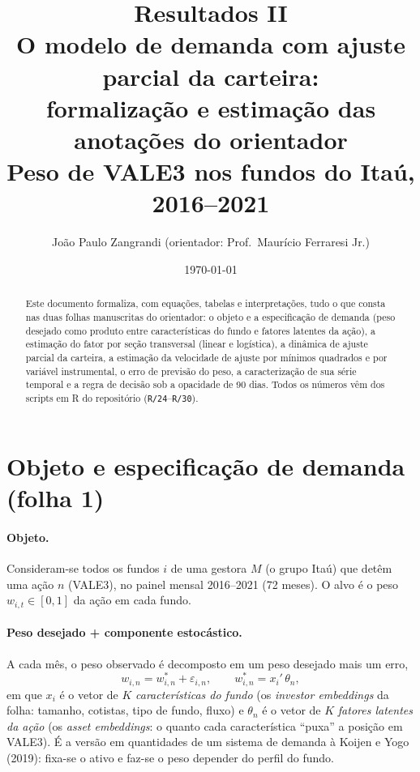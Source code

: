 \documentclass[11pt,a4paper]{article}
\title{\textbf{Resultados II}\\[3pt]
\large O modelo de demanda com ajuste parcial da carteira:\\
formalização e estimação das anotações do orientador\\[4pt]
\normalsize Peso de VALE3 nos fundos do Itaú, 2016--2021}
\author{João Paulo Zangrandi \quad (orientador: Prof.\ Maurício Ferraresi Jr.)}
\date{\today}
\begin{document}
\maketitle

\begin{abstract}
\noindent Este documento formaliza, com equações, tabelas e interpretações, tudo o que consta nas
duas folhas manuscritas do orientador: o objeto e a especificação de demanda (peso desejado como
produto entre características do fundo e fatores latentes da ação), a estimação do fator por seção
transversal (linear e logística), a dinâmica de ajuste parcial da carteira, a estimação da
velocidade de ajuste por mínimos quadrados e por variável instrumental, o erro de previsão do peso,
a caracterização de sua série temporal e a regra de decisão sob a opacidade de 90 dias. Todos os
números vêm dos scripts em R do repositório (\texttt{R/24}--\texttt{R/30}).
\end{abstract}

\tableofcontents
\bigskip

\section{Objeto e especificação de demanda (folha 1)}

\paragraph{Objeto.} Consideram-se todos os fundos $i$ de uma gestora $M$ (o grupo Itaú) que detêm
uma ação $n$ (VALE3), no painel mensal 2016--2021 (72 meses). O alvo é o peso $w_{i,t}\in[0,1]$ da
ação em cada fundo.

\paragraph{Peso desejado + componente estocástico.} A cada mês, o peso observado é decomposto em um
peso desejado mais um erro,
\begin{equation}
w_{i,n} = w^{*}_{i,n} + \varepsilon_{i,n}, \qquad w^{*}_{i,n} = x_i'\,\theta_n,
\label{eq:demanda}
\end{equation}
em que $x_i$ é o vetor de $K$ \emph{características do fundo} (os \emph{investor embeddings} da folha:
tamanho, cotistas, tipo de fundo, fluxo) e $\theta_n$ é o vetor de $K$ \emph{fatores latentes da
ação} (os \emph{asset embeddings}: o quanto cada característica ``puxa'' a posição em VALE3). É a
versão em quantidades de um sistema de demanda à Koijen e Yogo (2019): fixa-se o ativo e faz-se o
peso depender do perfil do fundo.
\end{document}
